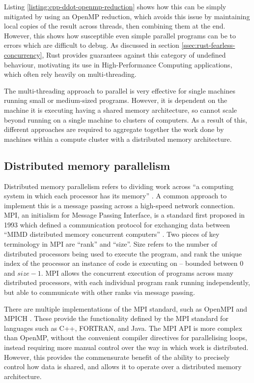 Listing \ref{listing:cpp-ddot-openmp-reduction} shows how this can be simply mitigated by using an OpenMP reduction, which avoids this issue by maintaining local copies of the result across threads, then combining them at the end. However, this shows how susceptible even simple parallel programs can be to errors which are difficult to debug. As discussed in section \ref{ssec:rust-fearless-concurrency}, Rust provides guarantees against this category of undefined behaviour, motivating its use in High-Performance Computing applications, which often rely heavily on multi-threading.

The multi-threading approach to parallel is very effective for single machines running small or medium-sized programs. However, it is dependent on the machine it is executing having a shared memory architecture, so cannot scale beyond running on a single machine to clusters of computers. As a result of this, different approaches are required to aggregate together the work done by machines within a compute cluster with a distributed memory architecture.

\subsection{Distributed memory parallelism}
\label{ssec:distributed-memory-paralellism}

Distributed memory parallelism refers to dividing work across ``a computing system in which each processor has its memory'' \cite{pardo2021modeling}. A common approach to implement this is a message passing across a high-speed network connection. MPI, an initialism for Message Passing Interface, is a standard first proposed in 1993 which defined a communication protocol for exchanging data between ``MIMD distributed memory concurrent computers'' \cite{thempiforumMPIMessagePassing1993}. Two pieces of key terminology in MPI are ``rank'' and ``size''. Size refers to the number of distributed processors being used to execute the program, and rank the unique index of the processor an instance of code is executing on -- bounded between $0$ and $size-1$. MPI allows the concurrent execution of programs across many distributed processors, with each individual program rank running independently, but able to communicate with other ranks via message passing.

There are multiple implementations of the MPI standard, such as OpenMPI \cite{gabriel2004open} and MPICH \cite{gropp1996user}. These provide the functionality defined by the MPI standard for languages such as C++, FORTRAN, and Java. The MPI API is more complex than OpenMP, without the convenient compiler directives for parallelising loops, instead requiring more manual control over the way in which work is distributed. However, this provides the commensurate benefit of the ability to precisely control how data is shared, and allows it to operate over a distributed memory architecture.

